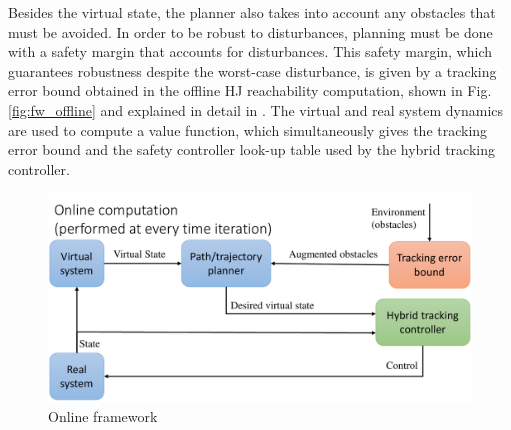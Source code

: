 Besides the virtual state, the planner also takes into account any obstacles that must be avoided. In order to be robust to disturbances, planning must be done with a safety margin that accounts for disturbances. This safety margin, which guarantees robustness despite the worst-case disturbance, is given by a tracking error bound obtained in the offline HJ reachability computation, shown in Fig. \ref{fig:fw_offline} and explained in detail in . The virtual and real system dynamics are used to compute a value function, which simultaneously gives the tracking error bound and the safety controller look-up table used by the hybrid tracking controller.
%
%
%
%
%

\begin{figure}[h!]
\includegraphics[width=\columnwidth]{fig/framework_online}
\caption{Online framework}
\label{fig:fw_online}
\end{figure}

